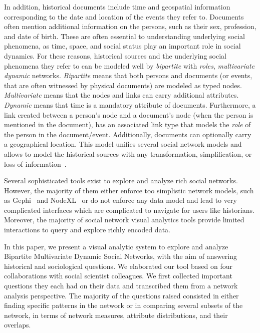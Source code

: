 In addition, historical documents include time and geospatial information corresponding to the date and location of the events they refer to. Documents often mention additional information on the persons, such as their sex, profession, and date of birth. These are often essential to understanding underlying social phenomena, as time, space, and social status play an important role in social dynamics.
For these reasons, historical sources and the underlying social phenomena they refer to can be modeled well by \emph{bipartite} with \emph{roles},  \emph{multivariate} \emph{dynamic} networks. \emph{Bipartite} means that both persons and documents (or events, that are often witnessed by physical documents) are modeled as typed nodes. \emph{Multivariate} means that the nodes and links can carry additional attributes. \emph{Dynamic} means that time is a mandatory attribute of documents. Furthermore, a link created between a person's node and a document's node (when the person is mentioned in the document), has an associated link type that models the \emph{role} of the person in the document/event. Additionally, documents can optionally carry a geographical location. This model unifies several social network models and allows to model the historical sources with any transformation, simplification, or loss of information~\cite{cristofoliAuxSourcesGrands2008}.

Several sophisticated tools exist to explore and analyze rich social networks. However, the majority of them either enforce too simplistic network models, such as Gephi~\cite{Gephi} and NodeXL~\cite{NodeXL} or do not enforce any data model and lead to very complicated interfaces which are complicated to navigate for users like historians.
Moreover, the majority of social network visual analytics tools provide limited interactions to query and explore richly encoded data.


In this paper, we present a visual analytic system to explore and analyze Bipartite Multivariate Dynamic Social Networks, with the aim of answering historical and sociological questions. We elaborated our tool based on four collaborations with social scientist colleagues. We first collected important questions they each had on their data and transcribed them from a network analysis perspective. The majority of the questions raised consisted in either finding specific patterns in the network or in comparing several subsets of the network, in terms of network measures, attribute distributions, and their overlaps.

